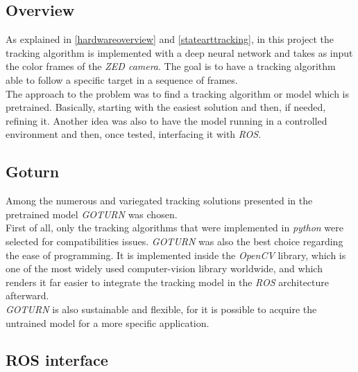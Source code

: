 		\subsection{Overview}
		
		As explained in \vref{hardwareoverview} and \vref{statearttracking}, in this project
		the tracking algorithm is implemented with a deep neural network and takes as input
		the color frames of the \textit{ZED camera}. The goal is
		to have a tracking algorithm able to follow a specific target in 
		a sequence of frames.
		\\\indent The approach to the problem was to find a tracking algorithm or model 
		which is pretrained. Basically, starting with the easiest solution and 
		then, if needed, refining it. Another idea was also to 
		have the model running in a controlled environment and then, once tested, 
		interfacing it with \textit{ROS}.
		
		\subsection{Goturn}
		
		Among the numerous and variegated tracking solutions presented in 
		\cite{trakinglist} the pretrained model \textit{GOTURN} was chosen.
		\\\indent First of all, only the tracking algorithms that were
		implemented in \textit{python} were selected for compatibilities issues.
		\textit{GOTURN} was also the best choice regarding the ease of 
		programming. It is implemented inside the \textit{OpenCV}
		library, which is one of the most widely used
		computer-vision library worldwide, and which renders it far easier
		to integrate the tracking model in the \textit{ROS} architecture
		afterward. \cite{goturn}
		\\\indent \textit{GOTURN} is also sustainable and flexible, for it is
		possible to acquire the untrained model for a more 
		specific application.\cite{goturnpy}
		
		\subsection{ROS interface}
		
